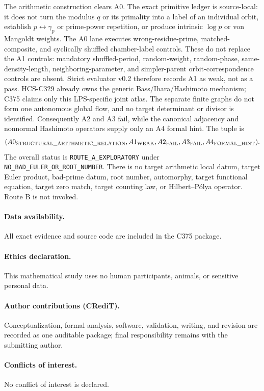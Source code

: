 \documentclass[10pt]{article}
\newcommand{\Scope}{\texttt{NO\_BAD\_EULER\_OR\_ROOT\_NUMBER}}
\begin{document}
The arithmetic construction clears A0. The exact primitive ledger is
source-local: it does not turn the modulus $q$ or its primality into a label
of an individual orbit, establish $p\leftrightarrow\gamma_p$ or prime-power
repetition, or produce intrinsic $\log p$ or von Mangoldt weights. The
A0 lane executes wrong-residue-prime, matched-composite, and cyclically
shuffled chamber-label controls. These do not replace the A1 controls:
mandatory shuffled-period, random-weight, random-phase, same-density-length,
neighboring-parameter, and simpler-parent orbit-correspondence controls are
absent. Strict evaluator v0.2 therefore records
A1 as weak, not as a pass. HCS-C329 already owns the generic
Bass/Ihara/Hashimoto mechanism; C375 claims only this LPS-specific joint
atlas. The separate finite graphs do not form one autonomous global flow,
and no target determinant or divisor is identified. Consequently A2 and A3
fail, while the canonical adjacency and nonnormal Hashimoto operators supply
only an A4 formal hint. The tuple is
\[
 (A0_{\rm STRUCTURAL\_ARITHMETIC\_RELATION},A1_{\rm WEAK},
 A2_{\rm FAIL},A3_{\rm FAIL},A4_{\rm FORMAL\_HINT}).
\]
The overall status is \texttt{ROUTE\_A\_EXPLORATORY} under
\Scope. There is no target arithmetic local datum, target Euler product,
bad-prime datum, root number, automorphy, target functional equation,
target zero match, target counting law, or Hilbert--P\'olya operator. Route B
is not invoked.

\paragraph{Data availability.}
All exact evidence and source code are included in the C375 package.
\paragraph{Ethics declaration.}
This mathematical study uses no human participants, animals, or sensitive
personal data.
\paragraph{Author contributions (CRediT).}
Conceptualization, formal analysis, software, validation, writing, and
revision are recorded as one auditable package; final responsibility remains
with the submitting author.
\paragraph{Conflicts of interest.}
No conflict of interest is declared.
\end{document}
